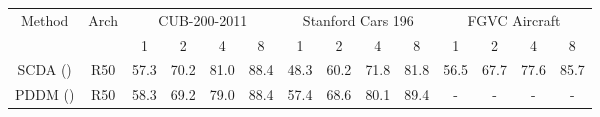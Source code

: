 \documentclass[letterpaper]{article} %
\begin{document}
\begin{table}\centering

	\begin{tabular}{c|c||cccc|cccc|cccc}
		\hline
		\hline
       \multirow{2.5}{*}{Method} & \multirow{2.5}{*}{Arch}& \multicolumn{4}{|c|}{CUB-200-2011}&  \multicolumn{4}{c|}{Stanford Cars 196} & \multicolumn{4}{c}{FGVC Aircraft}\\
		\cline{3-14}
		&  & 1&2&4&8& 1&2&4&8& 1&2&4&8 \\
		\hline
		\hline
		SCDA (\citeauthor{DBLP:journals/tip/WeiLWZ17})& R50& 57.3 & 70.2 & 81.0 &88.4& 48.3& 60.2&71.8&81.8& 56.5& 67.7&77.6&85.7\\
PDDM (\citeauthor{DBLP:journals/tog/Bala15})& R50& 58.3&69.2&79.0&88.4&57.4&68.6&80.1&89.4&-&-&-&-\\


\end{tabular}
\end{table}
\end{document}
